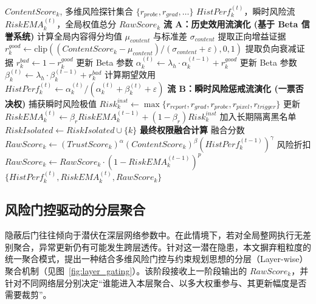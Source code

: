 \documentclass[11pt, a4paper, UTF8, fontset=fandol]{ctexart}
\begin{document}
\begin{algorithm}[htbp]
    \caption{双流正交信任状态演化 (HistPerf \& RiskEMA)}
    \label{alg:phase3}
    \begin{algorithmic}[1]
        \REQUIRE $ContentScore_k$, 多维风险探针集合 $\{r_{probe}, r_{grad}, \dots\}$
        \ENSURE $HistPerf_k^{(t)}$，瞬时风险流 $RiskEMA_k^{(t)}$，全局权值总分 $RawScore_k$
        \STATE \textbf{流 A：历史效用流演化 (基于 Beta 信誉系统)}
        \STATE 计算全局内容得分均值 $\mu_{content}$ 与标准差 $\sigma_{content}$
        \STATE 提取正向增益证据 $r_{k}^{good} \leftarrow \mathrm{clip}((ContentScore_k - \mu_{content}) / (\sigma_{content} + \varepsilon), 0, 1)$
        \STATE 提取负向衰减证据 $r_{k}^{bad} \leftarrow 1 - r_{k}^{good}$
        \STATE 更新 Beta 参数 $\alpha_{k}^{(t)} \leftarrow \lambda_h \cdot \alpha_{k}^{(t-1)} + r_{k}^{good}$
        \STATE 更新 Beta 参数 $\beta_{k}^{(t)} \leftarrow \lambda_h \cdot \beta_{k}^{(t-1)} + r_{k}^{bad}$
        \STATE 计算期望效用 $HistPerf_k^{(t)} \leftarrow \alpha_k^{(t)} / (\alpha_k^{(t)} + \beta_k^{(t)} + \varepsilon)$
        \ENDFOR
        \STATE \textbf{流 B：瞬时风险惩戒流演化 (一票否决权)}
        \STATE 捕获瞬时风险极值 $Risk_k^{inst} \leftarrow \max\{r_{report}, r_{grad}, r_{probe}, r_{pixel}, r_{trigger}\}$
        \STATE 更新 $RiskEMA_k^{(t)} \leftarrow \beta_r RiskEMA_k^{(t-1)} + (1-\beta_r) Risk_k^{inst}$
        \STATE 加入长期隔离黑名单 $RiskIsolated \leftarrow RiskIsolated \cup \{k\}$
        \ENDIF
        \ENDFOR
        \STATE \textbf{最终权限融合计算}
        \STATE 融合分数 $RawScore_k \leftarrow (TrustScore_k)^\alpha (ContentScore_k)^\beta (HistPerf_k^{(t-1)})^\gamma$
        \STATE 风险折扣 $RawScore_k \leftarrow RawScore_k \cdot (1 - RiskEMA_k^{(t-1)})^p$
        \ENDFOR
        \RETURN $\{HistPerf_k^{(t)}, RiskEMA_k^{(t)}, RawScore_k\}$
    \end{algorithmic}
\end{algorithm}


\subsection{风险门控驱动的分层聚合}
隐蔽后门往往倾向于潜伏在深层网络参数中。在此情境下，若对全局整网执行无差别聚合，异常更新仍有可能发生跨层透传。针对这一潜在隐患，本文摒弃粗粒度的统一聚合模式，提出一种结合多维风险门控与约束规划思想的分层（Layer-wise）聚合机制（见图~\ref{fig:layer_gating}）。该阶段接收上一阶段输出的 $RawScore_k$，并针对不同网络层分别决定“谁能进入本层聚合、以多大权重参与、其更新幅度是否需要裁剪”。
\end{document}
